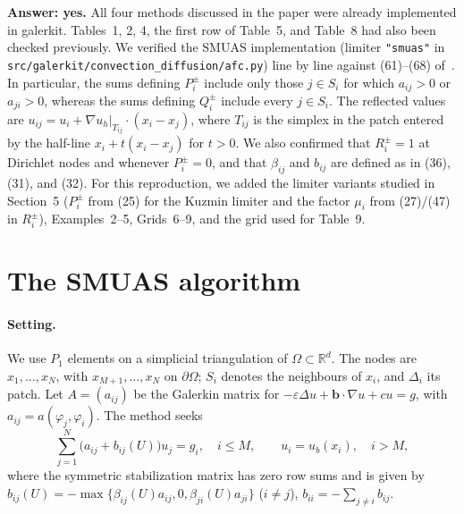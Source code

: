 \documentclass[11pt]{article}
\newcommand{\eps}{\varepsilon}
\newcommand{\bb}{\boldsymbol{b}}
\newcommand{\R}{\mathbb{R}}
\begin{document}
\textbf{Answer: yes.} All four methods discussed in the paper were already implemented in galerkit. Tables~1, 2, 4,
the first row of Table~5, and Table~8 had also been checked previously. We verified the SMUAS implementation
(limiter \texttt{"smuas"} in\\ \texttt{src/galerkit/convection\_diffusion/afc.py}) line by line against
(61)--(68) of~\cite{Kn23}. In particular, the sums defining $P_i^\pm$ include only those $j\in S_i$ for which
$a_{ij}>0$ or $a_{ji}>0$, whereas the sums defining $Q_i^\pm$ include every $j\in S_i$. The reflected values are
$u_{ij}=u_i+\nabla u_h|_{T_{ij}}\cdot(x_i-x_j)$, where $T_{ij}$ is the simplex in the patch entered by the half-line
$x_i+t(x_i-x_j)$ for $t>0$. We also confirmed that $R_i^\pm=1$ at Dirichlet nodes and whenever $P_i^\pm=0$, and that
$\beta_{ij}$ and $b_{ij}$ are defined as in (36), (31), and (32). For this reproduction, we added the limiter
variants studied in Section~5 ($P_i^\pm$ from (25) for the Kuzmin limiter and the factor $\mu_i$ from (27)/(47) in
$R_i^\pm$), Examples~2--5, Grids~6--9, and the grid used for Table~9.

\section{The SMUAS algorithm}\label{sec:alg}

\paragraph{Setting.} We use $P_1$ elements on a simplicial triangulation of $\Omega\subset\R^d$. The nodes are
$x_1,\dots,x_N$, with $x_{M+1},\dots,x_N$ on $\partial\Omega$; $S_i$ denotes the neighbours of $x_i$, and $\Delta_i$
its patch. Let $A=(a_{ij})$ be the Galerkin matrix for $-\eps\Delta u+\bb\cdot\nabla u+cu=g$, with
$a_{ij}=a(\varphi_j,\varphi_i)$. The method seeks
\begin{equation}\label{eq:alg}
  \sum_{j=1}^N\bigl(a_{ij}+b_{ij}(U)\bigr)u_j=g_i,\quad i\le M,\qquad u_i=u_b(x_i),\quad i>M,
\end{equation}
where the symmetric stabilization matrix has zero row sums and is given by
$b_{ij}(U)=-\max\{\beta_{ij}(U)a_{ij},0,\beta_{ji}(U)a_{ji}\}$ ($i\ne j$), $b_{ii}=-\sum_{j\ne i}b_{ij}$.
\end{document}
